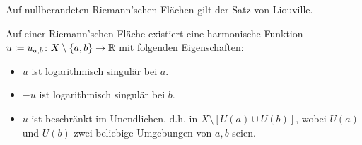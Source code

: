 \begin{frame}
    \begin{lemma}
        Auf nullberandeten Riemann'schen Flächen gilt der Satz von Liouville.
    \end{lemma}
    \begin{lemma}
        Auf einer Riemann'schen Fläche existiert eine harmonische Funktion $u \coloneqq u_{a,b} \colon X \setminus \{a, b\} \to \mathbb{R}$ mit folgenden Eigenschaften:
        \begin{itemize}
            \item $u$ ist logarithmisch singulär bei $a$.
            \item $-u$ ist logarithmisch singulär bei $b$.
            \item $u$ ist beschränkt im Unendlichen, d.h. in $X \setminus [U (a) \cup U (b)]$, wobei $U(a)$ und $U(b)$ zwei beliebige Umgebungen von $a, b$ seien.
        \end{itemize}
    \end{lemma}
\end{frame}